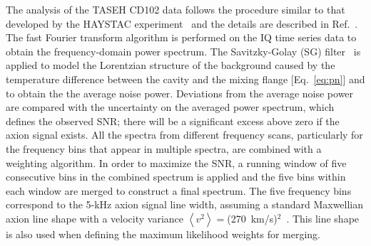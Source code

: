 \documentclass[%
 reprint,prl, %
superscriptaddress,
nobibnotes,
 amsmath,amssymb,
 aps,
]{revtex4-2}
\newcommand{\ma}{\ensuremath{m_a}}
\begin{document}
%




   The analysis of the TASEH CD102 data follows the procedure similar to that 
developed by the HAYSTAC experiment~\cite{HAYSTACII} and the details are 
described in Ref.~\cite{TASEHAnalysis}. The fast Fourier transform 
algorithm is performed on the IQ time series data to obtain the 
frequency-domain power spectrum. 
The Savitzky-Golay (SG) 
filter~\cite{SGFilter} is applied to model the Lorentzian structure of 
the background caused by the temperature difference between the cavity and 
the mixing flange [Eq.~\eqref{eq:pn}] and to obtain the 
the average noise power. %
Deviations from the average noise power are compared with the 
uncertainty on the averaged power spectrum, which defines the 
observed SNR; there will be a significant excess above zero if the 
axion signal exists. All the spectra from different 
frequency scans, particularly for the frequency bins that appear in 
multiple spectra, are combined with a weighting algorithm. 
In order to maximize the SNR, a running window of 
five consecutive bins in the combined spectrum is applied and the five bins 
within each window are merged to construct a final spectrum. 
The five frequency bins correspond to the 5-kHz axion signal line width,  
assuming a standard Maxwellian axion line shape with a velocity 
variance $\left<v^2\right>=$(270~km/s)$^2$~\cite{HAYSTACII}. 
This line shape is also used when defining the maximum likelihood 
weights for merging. 
\end{document}
